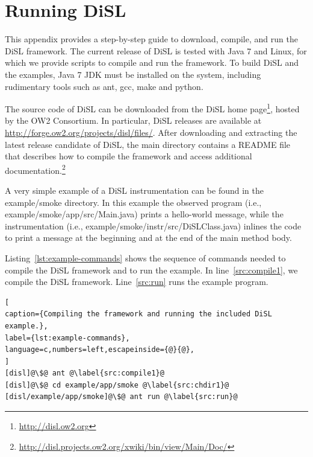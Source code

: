 \documentclass{article}
\newcommand{\brcode}[1]{\textsf{#1}}
\newcommand{\code}[1]{\mbox{\brcode{#1}}}
\begin{document}
\section{Running DiSL}\label{sec:Setup}

This appendix provides a step-by-step guide to download, compile, and run the DiSL framework.
The current release of DiSL is tested with Java 7 and Linux, for which we provide scripts to compile and run the framework.
To build DiSL and the examples, Java 7 JDK must be installed on the system,
including rudimentary tools such as \code{ant}, \code{gcc}, \code{make} and \code{python}.


The source code of DiSL can be downloaded from the DiSL home page\footnote{\url{http://disl.ow2.org}}, hosted by the OW2 Consortium.
In particular, DiSL releases are available at \url{http://forge.ow2.org/projects/disl/files/}.
After downloading and extracting the latest release candidate of DiSL, the main directory contains a \code{README} file that describes how to compile the framework and access additional documentation.\footnote{\url{http://disl.projects.ow2.org/xwiki/bin/view/Main/Doc/}}

\medskip
A very simple example of a DiSL instrumentation can be found in the \code{example/smoke} directory.
In this example the observed program (i.e., \code{example/smoke/app/src/Main.java}) prints a hello-world message, while the instrumentation (i.e., \code{example/smoke/instr/src/DiSLClass.java}) inlines the code to print a message at the beginning and at the end of the main method body.

Listing~\ref{lst:example-commands} shows the sequence of commands needed to compile the DiSL framework and to run the example.
In line~\ref{src:compile1}, we compile the DiSL framework.
Line~\ref{src:run} runs the example program.

\begin{lstlisting}[
caption={Compiling the framework and running the included DiSL example.},
label={lst:example-commands},
language=c,numbers=left,escapeinside={@}{@},
]
[disl]@\$@ ant @\label{src:compile1}@
[disl]@\$@ cd example/app/smoke @\label{src:chdir1}@
[disl/example/app/smoke]@\$@ ant run @\label{src:run}@
\end{lstlisting}
\end{document}
